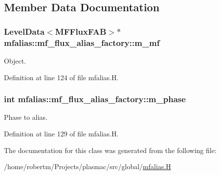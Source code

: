 \subsection{Member Data Documentation}
\subsubsection[{\texorpdfstring{m\+\_\+mf}{m_mf}}]{\setlength{\rightskip}{0pt plus 5cm}Level\+Data$<$M\+F\+Flux\+F\+AB$>$$\ast$ mfalias\+::mf\+\_\+flux\+\_\+alias\+\_\+factory\+::m\+\_\+mf\hspace{0.3cm}{\ttfamily [private]}}\hypertarget{classmfalias_1_1mf__flux__alias__factory_a5df3267770af0e472d2909f906c053e2}{}\label{classmfalias_1_1mf__flux__alias__factory_a5df3267770af0e472d2909f906c053e2}


Object. 



Definition at line 124 of file mfalias.\+H.

\subsubsection[{\texorpdfstring{m\+\_\+phase}{m_phase}}]{\setlength{\rightskip}{0pt plus 5cm}int mfalias\+::mf\+\_\+flux\+\_\+alias\+\_\+factory\+::m\+\_\+phase\hspace{0.3cm}{\ttfamily [private]}}\hypertarget{classmfalias_1_1mf__flux__alias__factory_a68caadafcc2226984b0c40cc212994e4}{}\label{classmfalias_1_1mf__flux__alias__factory_a68caadafcc2226984b0c40cc212994e4}


Phase to alias. 



Definition at line 129 of file mfalias.\+H.



The documentation for this class was generated from the following file\+:\begin{DoxyCompactItemize}
\item 
/home/robertm/\+Projects/plasmac/src/global/\hyperlink{mfalias_8H}{mfalias.\+H}\end{DoxyCompactItemize}
